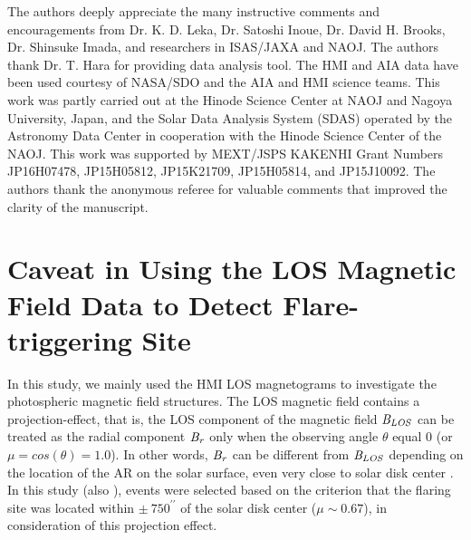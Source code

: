 \documentclass[10pt,preprint2]{aastex}
\begin{document}

\acknowledgments

The authors deeply appreciate the many instructive comments and encouragements from Dr. K. D. Leka, Dr. Satoshi Inoue, Dr. David H. Brooks, Dr. Shinsuke Imada, and researchers in ISAS/JAXA and NAOJ.
 The authors thank Dr. T. Hara for providing data analysis tool.
The HMI and AIA data have been used courtesy of NASA/SDO and the AIA and HMI science teams.
This work was partly carried out at the Hinode Science Center at NAOJ and Nagoya University, Japan, and the Solar Data Analysis System (SDAS) operated by the Astronomy Data Center in cooperation with the Hinode Science Center of the NAOJ.
This work was supported by MEXT/JSPS KAKENHI Grant Numbers JP16H07478, JP15H05812, JP15K21709, JP15H05814, and JP15J10092.
The authors thank the anonymous referee for valuable comments that improved the clarity of the manuscript.



\appendix

\section{Caveat in Using the LOS Magnetic Field Data to Detect Flare-triggering Site} \label{sec:projection}

In this study, we mainly used the HMI LOS magnetograms to investigate the photospheric magnetic field structures.
The LOS magnetic field contains a projection-effect, that is, the LOS component of the magnetic field $\it{B}_{LOS}$ can be treated as the radial component $\it{B}_{r}$ only when the observing angle $\theta$ equal 0 (or $\mu = cos(\theta) = 1.0$).
In other words, $\it{B}_{r}$ can be different from $\it{B}_{LOS}$ depending on the location of the AR on the solar surface, even very close to solar disk center \citep{leka17}.
In this study (also \citet{bamba13, bamba14}), events were selected based on the criterion that the flaring site was located within $\pm~750^{\prime\prime}$ of the solar disk center ($\mu \sim 0.67$), in consideration of this projection effect.
\end{document}

